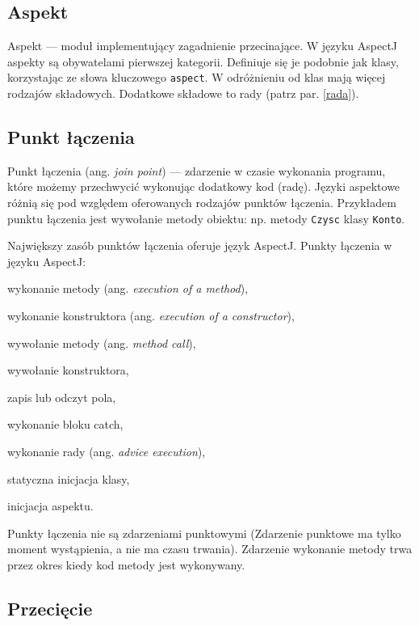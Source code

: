 \documentclass[a4paper,12pt]{mwbk}
\begin{document}
\subsection{Aspekt}

Aspekt --- moduł implementujący zagadnienie przecinające. W języku AspectJ
aspekty są obywatelami pierwszej kategorii.  Definiuje się je podobnie jak
klasy, korzystając ze słowa kluczowego \lstinline^aspect^. W odróżnieniu od
klas mają więcej rodzajów składowych. Dodatkowe składowe to rady (patrz par.
\ref{rada}).

\subsection{Punkt łączenia}

Punkt łączenia (ang. \emph{join point}) --- zdarzenie w czasie wykonania
programu, które możemy przechwycić wykonując dodatkowy kod (radę). Języki
aspektowe różnią się pod względem oferowanych rodzajów punktów łączenia.
Przykładem punktu łączenia jest wywołanie metody obiektu: np. metody
\lstinline^Czysc^ klasy \lstinline^Konto^.

Największy zasób punktów łączenia oferuje język AspectJ. Punkty łączenia w
języku AspectJ:

\begin{itemize*}
\item wykonanie metody (ang. \emph{execution of a method}),
\item wykonanie konstruktora (ang. \emph{execution of a constructor}),
\item wywołanie metody (ang. \emph{method call}),
\item wywołanie konstruktora,
\item zapis lub odczyt pola,
\item wykonanie bloku catch,
\item wykonanie rady (ang. \emph{advice execution}),
\item statyczna inicjacja klasy,
\item inicjacja aspektu.
\end{itemize*}

Punkty łączenia nie są zdarzeniami punktowymi (Zdarzenie punktowe ma tylko
moment wystąpienia, a nie ma czasu trwania). Zdarzenie wykonanie metody trwa
przez okres kiedy kod metody jest wykonywany. 


\subsection{Przecięcie}
\end{document}
